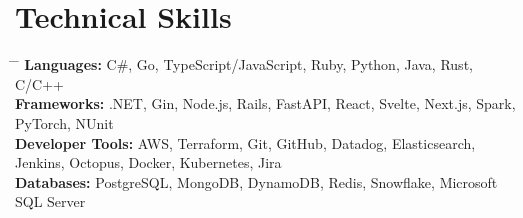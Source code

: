 \documentclass[letterpaper,11pt]{article}
\begin{document}
\section{Technical Skills}
\begin{itemize}[leftmargin=0.15in, label={}]
    \small{
    \item{
        \begin{tabbing}
          \hspace{8em} \= \hspace{10em} \= \kill
          \textbf{Languages:}\> C\#, Go, TypeScript/JavaScript, Ruby, Python, Java, Rust, C/C++ \\
          \textbf{Frameworks:} \> .NET, Gin, Node.js, Rails, FastAPI, React, Svelte, Next.js, Spark, PyTorch, NUnit \\
          \textbf{Developer Tools:} \> AWS, Terraform, Git, GitHub, Datadog, Elasticsearch, Jenkins, Octopus, Docker, Kubernetes, Jira \\
          \textbf{Databases:} \> PostgreSQL, MongoDB, DynamoDB, Redis, Snowflake, Microsoft SQL Server
        \end{tabbing}
    }}
\end{itemize}

\end{document}
